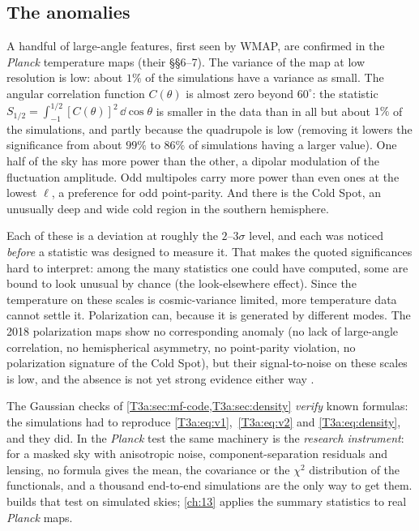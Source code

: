 \subsection{The anomalies}
\label{T3a:sec:anomalies}

A handful of large-angle features, first seen by WMAP, are confirmed in the \textit{Planck} temperature maps \cite{Planck2018VII} (their \S\S6--7). The variance of the map at low resolution is low: about $1\%$ of the simulations have a variance as small. The angular correlation function $C(\theta)$ is almost zero beyond $60^\circ$: the statistic $S_{1/2}=\int_{-1}^{1/2}[C(\theta)]^2\,\dd\cos\theta$ is smaller in the data than in all but about $1\%$ of the simulations, and partly because the quadrupole is low (removing it lowers the significance from about $99\%$ to $86\%$ of simulations having a larger value). One half of the sky has more power than the other, a dipolar modulation of the fluctuation amplitude. Odd multipoles carry more power than even ones at the lowest $\ell$, a preference for odd point-parity. And there is the Cold Spot, an unusually deep and wide cold region in the southern hemisphere.

Each of these is a deviation at roughly the $2$--$3\sigma$ level, and each was noticed \emph{before} a statistic was designed to measure it. That makes the quoted significances hard to interpret: among the many statistics one could have computed, some are bound to look unusual by chance (the look-elsewhere effect). Since the temperature on these scales is cosmic-variance limited, more temperature data cannot settle it. Polarization can, because it is generated by different modes. The 2018 polarization maps show no corresponding anomaly (no lack of large-angle correlation, no hemispherical asymmetry, no point-parity violation, no polarization signature of the Cold Spot), but their signal-to-noise on these scales is low, and the absence is not yet strong evidence either way \cite{Planck2018VII}.

\begin{inpractice}
The Gaussian checks of \cref{T3a:sec:mf-code,T3a:sec:density} \emph{verify} known formulas: the simulations had to reproduce \eqref{T3a:eq:v1},~\eqref{T3a:eq:v2} and \eqref{T3a:eq:density}, and they did. In the \textit{Planck} test the same machinery is the \emph{research instrument}: for a masked sky with anisotropic noise, component-separation residuals and lensing, no formula gives the mean, the covariance or the $\chi^2$ distribution of the functionals, and a thousand end-to-end simulations are the only way to get them.  builds that test on simulated skies; \cref{ch:13} applies the summary statistics to real \textit{Planck} maps.
\end{inpractice}
